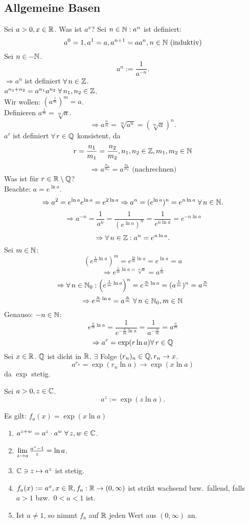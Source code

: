 \documentclass[../ana2.tex]{subfiles}
\begin{document}
\subsection*{Allgemeine Basen}
Sei \( a > 0, x\in\mathbb{R} \). Was ist \( a^x \)?
Sei \( n \in \mathbb{N}: a^n \) ist definiert:
\[ a^0 = 1, a^1 = a, a^{n+1} = aa^n, n \in \mathbb{N} \text{ (induktiv)} \]
Sei \( n \in -\mathbb{N} \). 
\[ a^n := \frac{1}{a^{-n}}. \]
\( \Rightarrow a^n \) ist definiert \( \forall n\in\Z \).\\
\( a^{n_1 + n_2} = a^{n_1} a^{n_2} \;\forall n_1, n_2 \in\Z \).\\
Wir wollen: \( (a^\frac{1}{m})^m = a \).\\
Definieren \( a^{\frac{1}{m}} = \sqrt[m]{a} \).
\[ \Rightarrow a^{\frac{n}{m}} = \sqrt[m]{a^n} 
= (\sqrt[m]{a})^n. \]
\( a^r \) ist definiert \( \forall r \in \Q \) konsistent, da
\[ r = \frac{n_1}{m_1} = \frac{n_2}{m_2}
, n_1,n_2 \in \mathbb{Z}, m_1,m_2 \in \mathbb{N} \]
\[ \Rightarrow a^{\frac{n_1}{m_1}} = a^{\frac{n_2}{m_2}} 
\text{ (nachrechnen)} \]
Was ist für \( r\in \mathbb{R} \setminus \mathbb{Q} \)?\\
Beachte: \( a = e^{\ln a} \). 
\[ \Rightarrow a^2 = e^{\ln a} e^{\ln a} = e^{2\ln a}
\Rightarrow a^n = (e^{\ln a})^n = e^{n\ln a} \;\forall n\in\N. \]
\[ \Rightarrow a^{-n} = \frac{1}{a^n} = \frac{1}{(e^{\ln a})^n}
= \frac{1}{e^{n\ln a}} = e^{-n\ln a} \]
\[ \Rightarrow \forall n\in\Z: a^n = e^{n \ln a}. \]
Sei \( m \in \mathbb{N} \):
\[ \left( e^{\frac{1}{m} \ln a} \right)^m = e^{\frac{m}{m} \ln a}
= e^{\ln a} = a \]
\[ \Rightarrow e^{\frac{1}{m} \ln a = \sqrt[m]{a}} = a^{\frac{1}{m}} \]
\[ \Rightarrow \forall n\in\N_0: 
\left( e^{\frac{1}{m} \ln a} \right)^n 
= e^{\frac{n}{m} \ln a} = (a^{\frac{1}{m}})^n = a^{\frac{n}{m}} \]
\[ \Rightarrow e^{\frac{n}{m} \ln a} = a^{\frac{n}{m}} \;\forall n \in \N_0, m \in \N \]
Genauso: \( -n \in \mathbb{N} \):
\[ e^{\frac{n}{m} \ln a} = \frac{1}{e^{-\frac{n}{m} \ln a}}
= \frac{1}{a^{-\frac{n}{m}}} = a^{\frac{n}{m}} \]
\[ \Rightarrow a^r = \exp(r \ln a) \forall r \in \Q \]
Sei \( x\in\mathbb{R} \). \( \mathbb{Q} \) ist dicht in \( \mathbb{R} \). 
\( \exists \) Folge \( (r_n)_n \in \mathbb{Q}, r_n \rightarrow x \).\\
\[ a^{r_n} = \exp(r_n \ln a) \rightarrow \exp(x\ln a) \]
da \( \exp \) stetig.
\begin{defi}
    Sei \( a > 0, z\in\mathbb{C} \).
    \[ a^z := \exp(z \ln a). \]
\end{defi}
Es gilt: \( f_a(x) = \exp(x\ln a) \)
\begin{enumerate}
    \item \( a^{z+w} = a^z \cdot a^w \;\forall z,w \in \C \).
    \item \( \lim\limits_{z\rightarrow{}a} \frac{a^z -1}{z} = \ln a \).
    \item \( \mathbb{C} \ni z \mapsto a^z \) ist stetig.
    \item \( f_a(x) := a^x, x\in \mathbb{R}, f_a : \mathbb{R} \rightarrow (0,\infty) \)
    ist strikt wachsend bzw.\ fallend, falls
    \( a > 1 \) bzw.\  \( 0 < a < 1 \)
    ist.
    \item Ist \(a \neq 1 \), so nimmt \( f_a \) auf \( \mathbb{R} \) jeden Wert aus
    \( (0, \infty) \) an.
\end{enumerate}
\end{document}
